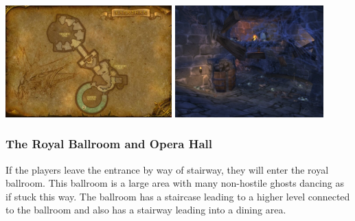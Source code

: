 \begin{center}
	\includegraphics[width=0.48\textwidth]{img/Karazhan/cropped-3457-6.jpg}
	\includegraphics[width=0.43\textwidth]{img/Karazhan/21983-karazhan-the-back-entrance-if-youve-cleared-the-opera-you-can-enter-the-instance.jpg}
\end{center}

\subsubsection{The Royal Ballroom and Opera Hall}

If the players leave the entrance by way of stairway, they will enter the royal ballroom. This ballroom is a large area with many non-hostile ghosts dancing as if stuck this way. The ballroom has a staircase leading to a higher level connected to the ballroom and also has a stairway leading into a dining area. 

